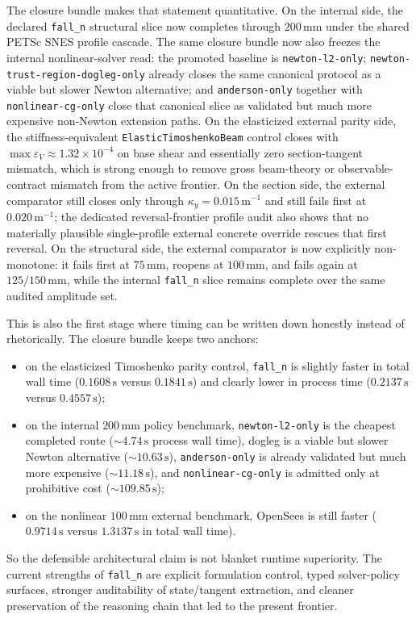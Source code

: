 The closure bundle makes that statement quantitative.  On the internal side,
the declared \texttt{fall\_n} structural slice now completes through
\(200\,\mathrm{mm}\) under the shared PETSc SNES profile cascade.  The same
closure bundle now also freezes the internal nonlinear-solver read: the
promoted baseline is \texttt{newton-l2-only}; \texttt{newton-trust-region-dogleg-only}
already closes the same canonical protocol as a viable but slower Newton
alternative; and \texttt{anderson-only} together with
\texttt{nonlinear-cg-only} close that canonical slice as validated but much
more expensive non-Newton extension paths.  On the
elasticized external parity side, the stiffness-equivalent
\texttt{ElasticTimoshenkoBeam} control closes with
\(\max \varepsilon_V \approx 1.32\times10^{-4}\) on base shear and
essentially zero section-tangent mismatch, which is strong enough to remove
gross beam-theory or observable-contract mismatch from the active frontier.
On the section side, the external comparator still closes only through
\(\kappa_y = 0.015\,\mathrm{m^{-1}}\) and still fails first at
\(0.020\,\mathrm{m^{-1}}\); the dedicated reversal-frontier profile audit also
shows that no materially plausible single-profile external concrete override
rescues that first reversal.  On the structural side, the external comparator
is now explicitly non-monotone: it fails first at \(75\,\mathrm{mm}\), reopens
at \(100\,\mathrm{mm}\), and fails again at \(125/150\,\mathrm{mm}\), while
the internal \texttt{fall\_n} slice remains complete over the same audited
amplitude set.

This is also the first stage where timing can be written down honestly instead
of rhetorically.  The closure bundle keeps two anchors:
\begin{itemize}
  \item on the elasticized Timoshenko parity control, \texttt{fall\_n} is
    slightly faster in total wall time
    (\(0.1608\,\mathrm{s}\) versus \(0.1841\,\mathrm{s}\)) and clearly lower in
    process time (\(0.2137\,\mathrm{s}\) versus \(0.4557\,\mathrm{s}\));
  \item on the internal \(200\,\mathrm{mm}\) policy benchmark,
    \texttt{newton-l2-only} is the cheapest completed route
    (\(\sim4.74\,\mathrm{s}\) process wall time), dogleg is a viable but slower
    Newton alternative (\(\sim10.63\,\mathrm{s}\)), \texttt{anderson-only} is
    already validated but much more expensive (\(\sim11.18\,\mathrm{s}\)), and
    \texttt{nonlinear-cg-only} is admitted only at prohibitive cost
    (\(\sim109.85\,\mathrm{s}\));
  \item on the nonlinear \(100\,\mathrm{mm}\) external benchmark, OpenSees is
    still faster (\(0.9714\,\mathrm{s}\) versus \(1.3137\,\mathrm{s}\) in total
    wall time).
\end{itemize}
So the defensible architectural claim is not blanket runtime superiority.  The
current strengths of \texttt{fall\_n} are explicit formulation control, typed
solver-policy surfaces, stronger auditability of state/tangent extraction, and
cleaner preservation of the reasoning chain that led to the present frontier.

